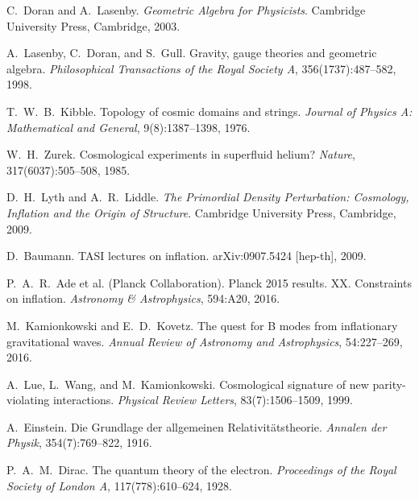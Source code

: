 \documentclass[11pt,a4paper]{article}
\numberwithin{equation}{section}
\theoremstyle{plain}
\theoremstyle{definition}
\theoremstyle{remark}
\begin{document}
\begin{thebibliography}{99}
C.~Doran and A.~Lasenby.
\newblock \emph{Geometric Algebra for Physicists}.
\newblock Cambridge University Press, Cambridge, 2003.

A.~Lasenby, C.~Doran, and S.~Gull.
\newblock Gravity, gauge theories and geometric algebra.
\newblock \emph{Philosophical Transactions of the Royal Society A}, 356(1737):487--582, 1998.

T.~W.~B.~Kibble.
\newblock Topology of cosmic domains and strings.
\newblock \emph{Journal of Physics A: Mathematical and General}, 9(8):1387--1398, 1976.

W.~H.~Zurek.
\newblock Cosmological experiments in superfluid helium?
\newblock \emph{Nature}, 317(6037):505--508, 1985.

D.~H.~Lyth and A.~R.~Liddle.
\newblock \emph{The Primordial Density Perturbation: Cosmology, Inflation and the Origin of Structure}.
\newblock Cambridge University Press, Cambridge, 2009.

D.~Baumann.
\newblock TASI lectures on inflation.
\newblock arXiv:0907.5424 [hep-th], 2009.

P.~A.~R.~Ade et al. (Planck Collaboration).
\newblock Planck 2015 results. XX. Constraints on inflation.
\newblock \emph{Astronomy \& Astrophysics}, 594:A20, 2016.

M.~Kamionkowski and E.~D.~Kovetz.
\newblock The quest for B modes from inflationary gravitational waves.
\newblock \emph{Annual Review of Astronomy and Astrophysics}, 54:227--269, 2016.

A.~Lue, L.~Wang, and M.~Kamionkowski.
\newblock Cosmological signature of new parity-violating interactions.
\newblock \emph{Physical Review Letters}, 83(7):1506--1509, 1999.

A.~Einstein.
\newblock Die Grundlage der allgemeinen Relativitätstheorie.
\newblock \emph{Annalen der Physik}, 354(7):769--822, 1916.

P.~A.~M.~Dirac.
\newblock The quantum theory of the electron.
\newblock \emph{Proceedings of the Royal Society of London A}, 117(778):610--624, 1928.

\end{thebibliography}
\end{document}
